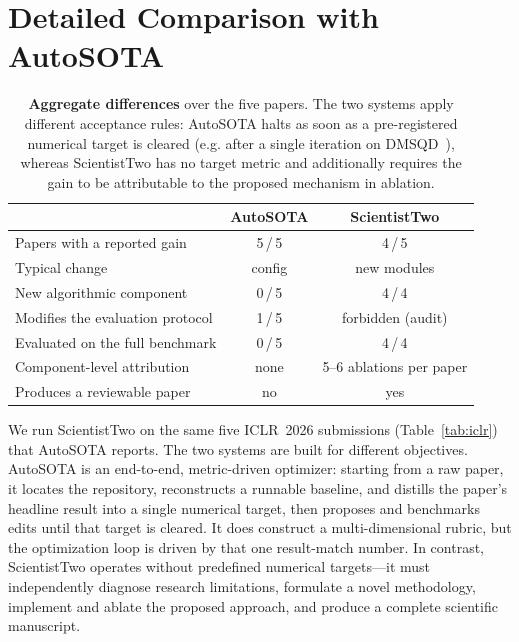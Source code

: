 
\section{Detailed Comparison with AutoSOTA}
\label{sec:autosota}

\begin{table}[h]
\centering
\small
\setlength{\tabcolsep}{5pt}
\renewcommand{\arraystretch}{1.1}
\caption{\textbf{Aggregate differences} over the five papers. The two systems apply different
acceptance rules: AutoSOTA halts as soon as a pre-registered numerical target is cleared (e.g. after a
single iteration on DMSQD~\citep{tjanaka2026discount}), whereas ScientistTwo has no target metric
and additionally requires the gain to be attributable to the proposed mechanism in ablation.}
\label{tab:autosota-quant}
\begin{tabular}{@{}lcc@{}}
\toprule
& \textbf{AutoSOTA} & \textbf{ScientistTwo} \\
\midrule
Papers with a reported gain             & 5\,/\,5 & 4\,/\,5 \\
Typical change                     & config & new modules \\
New algorithmic component               & 0\,/\,5 & 4\,/\,4 \\
Modifies the evaluation protocol        & 1\,/\,5 & forbidden (audit) \\
Evaluated on the full benchmark         & 0\,/\,5 & 4\,/\,4 \\
Component-level attribution             & none & 5--6 ablations per paper \\
Produces a reviewable paper             & no & yes   \\
\bottomrule
\end{tabular}
\end{table}

\noindent We run ScientistTwo on the same five ICLR~2026 submissions (Table~\ref{tab:iclr}) that
AutoSOTA reports. The two systems are built for different objectives. AutoSOTA is an
end-to-end, metric-driven optimizer: starting from a raw paper, it locates the repository,
reconstructs a runnable baseline, and distills the paper's headline result into a single
numerical target, then proposes and benchmarks edits until that target is cleared. It does
construct a multi-dimensional rubric, but the optimization loop is driven by that one
result-match number. In contrast, ScientistTwo operates without predefined numerical targets—it must independently diagnose research limitations, formulate a novel methodology, implement and ablate the proposed approach, and produce a complete scientific manuscript.


